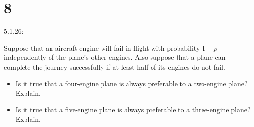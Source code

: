 \documentclass{article}
\begin{document}
\section*{8}
\begin{ques}\label{q8}
    5.1.26:

    Suppose that an aircraft engine will fail in flight with probability $1-p$ independently of the plane's other engines. Also suppose that a plane can complete the journey successfully if at least half of its engines do not fail.

    \begin{itemize}
        \item[(a)] Is it true that a four-engine plane is always preferable to a two-engine plane? Explain.
        \item[(b)] Is it true that a five-engine plane is always preferable to a three-engine plane? Explain.
    \end{itemize}
\end{ques}
\end{document}
